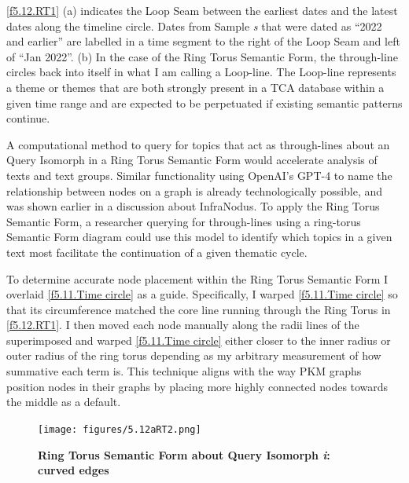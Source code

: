 \autoref{f5.12.RT1} (a) indicates the Loop Seam between the earliest dates and the latest dates along the timeline circle. Dates from Sample \textit{s} that were dated as “2022 and earlier” are labelled in a time segment to the right of the Loop Seam and left of “Jan 2022”. (b) In the case of the Ring Torus Semantic Form, the through-line circles back into itself in what I am calling a Loop-line. The Loop-line represents a theme or themes that are both strongly present in a TCA database within a given time range and are expected to be perpetuated if existing semantic patterns continue. 

A computational method to query for topics that act as through-lines about an Query Isomorph in a Ring Torus Semantic Form would accelerate analysis of texts and text groups. Similar functionality using OpenAI’s GPT-4 to name the relationship between nodes on a graph is already technologically possible, and was shown earlier in a discussion about InfraNodus. To apply the Ring Torus Semantic Form, a researcher querying for through-lines using a ring-torus Semantic Form diagram could use this model to identify which topics in a given text most facilitate the continuation of a given thematic cycle.

To determine accurate node placement within the Ring Torus Semantic Form I overlaid \autoref{f5.11.Time circle} as a guide. Specifically, I warped \autoref{f5.11.Time circle} so that its circumference matched the core line running through the Ring Torus in \autoref{f5.12.RT1}. I then moved each node manually along the radii lines of the superimposed and warped \autoref{f5.11.Time circle} either closer to the inner radius or outer radius of the ring torus depending as my arbitrary measurement of how summative each term is. This technique aligns with the way PKM graphs position nodes in their graphs by placing more highly connected nodes towards the middle as a default. 

\FloatBarrier  
\begin{figure}[h!]
    \centering
    \texttt{[image: figures/5.12aRT2.png]}
    \caption[Ring Torus Semantic Form about Query Isomorph \textit{i}: curved edges]{\textbf{Ring Torus Semantic Form about Query Isomorph \textit{i}: curved edges}
    \label{f5.12aRT2}}
\end{figure}
\FloatBarrier  


\clearpage

